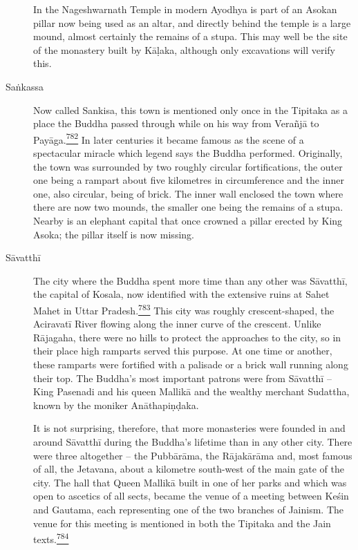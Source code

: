 \begin{description}
In the Nageshwarnath Temple in modern Ayodhya is part of an Asokan
pillar now being used as an altar, and directly behind the temple is a
large mound, almost certainly the remains of a stupa. This may well be
the site of the monastery built by Kāḷaka, although only excavations
will verify this.
\item[Saṅkassa]
Now called Sankisa, this town is mentioned only once in the Tipitaka as
a place the Buddha passed through while on his way from Verañjā to
Payāga.\label{footprints_split_019.html_fnref782}\hyperref[footprints_split_025.htmlux5cux23fn782]{\textsuperscript{782}}
In later centuries it became famous as the scene of a spectacular
miracle which legend says the Buddha performed. Originally, the town was
surrounded by two roughly circular fortifications, the outer one being a
rampart about five kilometres in circumference and the inner one, also
circular, being of brick. The inner wall enclosed the town where there
are now two mounds, the smaller one being the remains of a stupa. Nearby
is an elephant capital that once crowned a pillar erected by King Asoka;
the pillar itself is now missing.
\item[Sāvatthī]
The city where the Buddha spent more time than any other was Sāvatthī,
the capital of Kosala, now identified with the extensive ruins at Sahet
Mahet in Uttar
Pradesh.\label{footprints_split_019.html_fnref783}\hyperref[footprints_split_025.htmlux5cux23fn783]{\textsuperscript{783}}
This city was roughly crescent-shaped, the Aciravatī River flowing along
the inner curve of the crescent. Unlike Rājagaha, there were no hills to
protect the approaches to the city, so in their place high ramparts
served this purpose. At one time or another, these ramparts were
fortified with a palisade or a brick wall running along their top. The
Buddha's most important patrons were from Sāvatthī -- King Pasenadi and
his queen Mallikā and the wealthy merchant Sudattha, known by the
moniker Anāthapiṇḍaka.

It is not surprising, therefore, that more monasteries were founded in
and around Sāvatthī during the Buddha's lifetime than in any other city.
There were three altogether -- the Pubbārāma, the Rājakārāma and, most
famous of all, the Jetavana, about a kilometre south-west of the main
gate of the city. The hall that Queen Mallikā built in one of her parks
and which was open to ascetics of all sects, became the venue of a
meeting between Keśin and Gautama, each representing one of the two
branches of Jainism. The venue for this meeting is mentioned in both the
Tipitaka and the Jain
texts.\label{footprints_split_019.html_fnref784}\hyperref[footprints_split_025.htmlux5cux23fn784]{\textsuperscript{784}}


\end{description}
